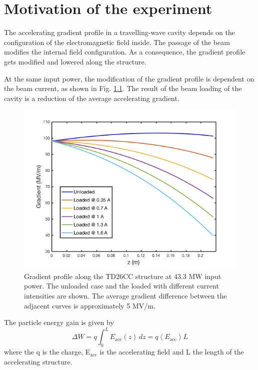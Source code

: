 \chapter[Motivation of the experiment]{Motivation of the experiment}
\label{chap:motivation}

The accelerating gradient profile in a travelling-wave cavity depends on the configuration of the electromagnetic field inside. The passage of the  beam modifies the internal field configuration. As a consequence, the gradient profile gets modified and lowered along the structure.

At the same input power, the modification of the gradient profile is dependent on the beam current, as shown in Fig. \ref{grad_vs_I}. The result of the beam loading of the cavity is a reduction of the average accelerating gradient.

\begin{figure}[h]
\centering 
\includegraphics[scale=0.5]{pictures/Gradient_vs_current.png}
\caption{Gradient profile along the TD26CC structure at 43.3 MW input power. The unloaded case and the loaded with different current intensities are shown. The average gradient difference between the adjacent curves is approximately 5 MV/m.}
\label{grad_vs_I}
\end{figure}

\noindent
The particle energy gain is given by 
\begin{equation}
\Delta W  = q \int_0^L E_{\text{acc}} (z) \, dz = q \left \langle E_{\text{acc}} \right \rangle L
\label{en_gain}
\end{equation}
where the q is the charge, E$_{\text{acc}}$ is the accelerating field and L the length of the accelerating structure.

